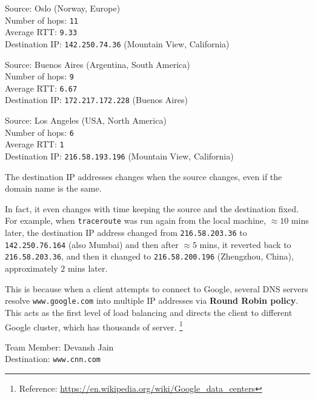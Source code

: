 \documentclass[11pt, fleqn]{article}
\begin{document}
\hrulefill
\smallskip

Source: Oslo (Norway, Europe)\\
Number of hops: \texttt{11}\\
Average RTT: \texttt{9.33}\\
Destination IP: \texttt{142.250.74.36} (Mountain View, California)

\hrulefill
\smallskip

Source: Buenos Aires (Argentina, South America)\\
Number of hops: \texttt{9}\\
Average RTT: \texttt{6.67}\\
Destination IP: \texttt{172.217.172.228} (Buenos Aires)

\hrulefill
\smallskip

Source: Los Angeles (USA, North America)\\
Number of hops: \texttt{6}\\
Average RTT: \texttt{1}\\
Destination IP: \texttt{216.58.193.196} (Mountain View, California)

\hrulefill
\medskip

The destination IP addresses changes when the source changes, even if the domain name is the same.

\smallskip

In fact, it even changes with time keeping the source and the destination fixed.\\ 
For example, when \texttt{traceroute} was run again from the local machine, $\approx 10$ mins later, the destination IP address changed from \texttt{216.58.203.36} to \texttt{142.250.76.164} (also Mumbai) and then after $\approx 5$ mins, it reverted back to \texttt{216.58.203.36}, and then it changed to \texttt{216.58.200.196} (Zhengzhou, China), approximately $2$ mins later.

\smallskip

This is because when a client attempts to connect to Google, several DNS servers resolve \texttt{www.google.com} into multiple IP addresses via \textbf{Round Robin policy}. This acts as the first level of load balancing and directs the client to different Google cluster, which has thousands of server. \footnote{Reference: \url{https://en.wikipedia.org/wiki/Google_data_centers}}

\newpage
Team Member: Devansh Jain\\
Destination: \texttt{www.cnn.com}

\hrulefill
\smallskip
\end{document}
